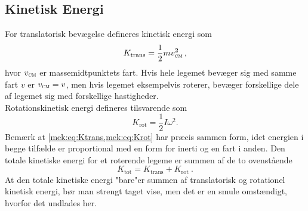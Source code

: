 \subsection{Kinetisk Energi}
For translatorisk bevægelse defineres kinetisk energi som
%
\begin{equation} \label{mek:eq:Ktrans}
    K_{\text{trans}}=\frac{1}{2}mv_\textsc{cm}^2 \,,
\end{equation}
%
hvor $v_\textsc{cm}$ er massemidtpunktets fart. Hvis hele legemet bevæger sig med samme fart $v$ er $v_\textsc{cm} = v$, men hvis legemet eksempelvis roterer, bevæger forskellige dele af legemet sig med forskellige hastigheder. \\
Rotationskinetisk energi defineres tilsvarende som
%
\begin{equation} \label{mek:eq:Krot}
    K_{\text{rot}}=\frac{1}{2}I\omega^2 .
\end{equation}
%
Bemærk at \cref{mek:eq:Ktrans,mek:eq:Krot} har præcis sammen form, idet energien i begge tilfælde er proportional med en form for inerti og en fart i anden. Den totale kinetiske energi for et roterende legeme er summen af de to ovenstående
%
\begin{equation} \label{mek:eq:K}
    K_{\text{tot}}=K_{\text{trans}}+K_{\text{rot}} \: .
\end{equation}
%
At den totale kinetiske energi "bare"\;er summen af translatorisk og rotationel kinetisk energi, bør man strengt taget vise, men det er en smule omstændigt, hvorfor det undlades her.

